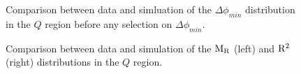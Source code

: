 \begin{figure}[htbp]
\centering
\caption{Comparison between data and simluation of the $\Delta\phi_{min}$ distribution in the $Q$
region before any selection on $\Delta\phi_{min}$.
\label{fig:boost_Q_region_mindeltaphi}}
\end{figure}
% 
% 
\begin{figure}[htbp]
\centering
\caption{Comparison between data and simulation of the $\mathrm{M_R}$ (left) and $\mathrm{R^2}$ (right)
distributions in the $Q$ region.
\label{fig:boost_Q_region_MR_Rsq}}
\end{figure}

% 
% 
% 

